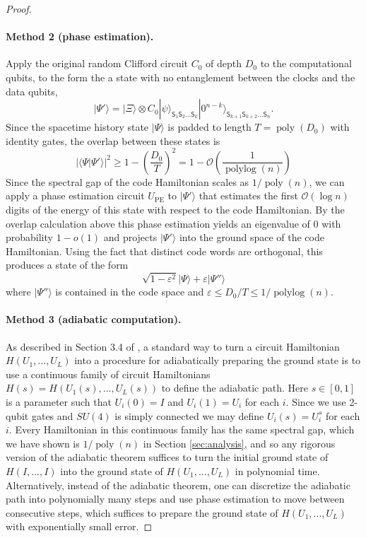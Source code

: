 \documentclass[11pt,letterpaper]{article}
\theoremstyle{definition}
\theoremstyle{remark}
\DeclareMathOperator{\poly}{poly}
\DeclareMathOperator{\polylog}{polylog}
\renewcommand{\leq}{\leqslant}
\renewcommand{\geq}{\geqslant}
\let\epsilon=\varepsilon
\numberwithin{equation}{section}
\let\origparagraph\paragraph
\renewcommand{\paragraph}[1]{\origparagraph{#1.}}
\theoremstyle{definition}
\newcommand{\ket}[1]{|#1\rangle}
\newcommand{\sS}{{\mathsf{S}}}
\begin{document}
\begin{proof}
\paragraph{Method 2 (phase estimation)}  Apply the original random Clifford circuit $C_0$ of depth $D_0$ to the computational qubits, to the form the a state with no entanglement between the clocks and the data qubits,
\begin{equation}
\ket{\Psi'} = \ket{\Xi} \otimes C_0 \ket{\psi}_{\sS_1 \sS_2 \ldots \sS_k} \ket{0^{n-k}}_{\sS_{k+1} \sS_{k+2} \ldots \sS_n}.
\end{equation}
Since the spacetime history state $|\Psi\rangle$ is padded to length $T = \poly(D_0)$ with identity gates, the overlap between these states is
\begin{equation}
| \langle {\Psi}|{\Psi'}\rangle|^2 \geq 1 -  \left(\frac{D_0}{T} \right)^2= 1 - \mathcal{O}\left(\frac{1}{\polylog(n)}\right)
\end{equation}
Since the spectral gap of the code Hamiltonian scales as $1/\poly(n)$, we can apply a phase estimation circuit $U_\textrm{PE}$ to $\ket{\Psi'}$ that estimates the first $\mathcal{O}(\log n)$ digits of the energy of this state with respect to the code Hamiltonian.  By the overlap calculation above this phase estimation yields an eigenvalue of 0 with probability $1 - o(1)$ and projects $|\Psi'\rangle$ into the ground space of the code Hamiltonian.  Using the fact that distinct code words are orthogonal, this produces a state of the form
\begin{equation}
\sqrt{1 -\epsilon^2} |\Psi\rangle + \epsilon | \Psi''\rangle
\end{equation}
where $\ket{\Psi''}$ is contained in the code space and $\epsilon \leq D_0 / T \leq 1/\polylog(n)$.  

\paragraph{Method 3 (adiabatic computation)}  As described in Section 3.4 of \cite{breuckmann2014space}, a standard way to turn a circuit Hamiltonian $H(U_1,...,U_L)$ into a procedure for adiabatically preparing the ground state is to use a continuous family of circuit Hamiltonians $H(s) = H(U_1(s), ... , U_L(s))$ to define the adiabatic path.   Here $s \in [0,1]$ is a parameter such that $U_i(0) = I$ and $U_i(1) = U_i$ for each $i$.  Since we use 2-qubit gates and $SU(4)$ is simply connected we may define $U_i(s) = U_i^s$ for each $i$.  Every Hamiltonian in this continuous family has the same spectral gap, which we have shown is $1/\poly(n)$ in Section \ref{sec:analysis}, and so any rigorous version of the adiabatic theorem suffices to turn the initial ground state of $H(I,...,I)$ into the ground state of $H(U_1,...,U_L)$ in polynomial time.  Alternatively, instead of the adiabatic theorem, one can discretize the adiabatic path into polynomially many steps and use phase estimation to move between consecutive steps, which suffices to prepare the ground state of $H(U_1,...,U_L)$ with exponentially small error.
\end{proof}
\end{document}
